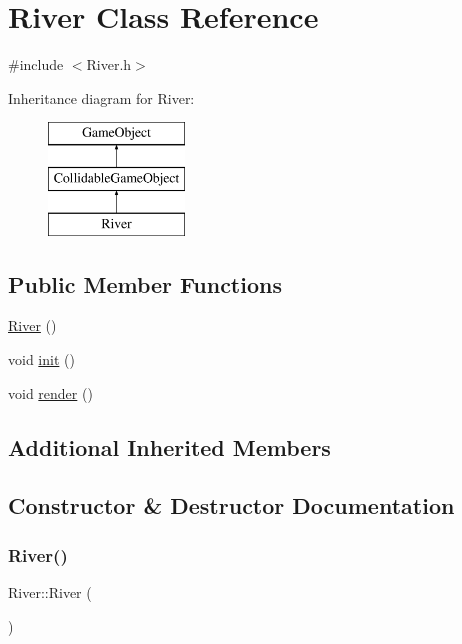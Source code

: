 \hypertarget{class_river}{}\section{River Class Reference}
\label{class_river}


{\ttfamily \#include $<$River.\+h$>$}

Inheritance diagram for River\+:\begin{figure}[H]
\begin{center}
\leavevmode
\includegraphics[height=3.000000cm]{class_river}
\end{center}
\end{figure}
\subsection*{Public Member Functions}
\begin{DoxyCompactItemize}
\item 
\hyperlink{class_river_a305d3ec8496a5373328045da3b8d8362}{River} ()
\item 
void \hyperlink{class_river_a34d39d986e411f957e77e85ba5719af4}{init} ()
\item 
void \hyperlink{class_river_abf5ba1cc4356fbf57059da23e3a1997a}{render} ()
\end{DoxyCompactItemize}
\subsection*{Additional Inherited Members}


\subsection{Constructor \& Destructor Documentation}
\mbox{\label{class_river_a305d3ec8496a5373328045da3b8d8362}} 
\subsubsection{\texorpdfstring{River()}{River()}}
{\footnotesize\ttfamily River\+::\+River (\begin{DoxyParamCaption}{ }\end{DoxyParamCaption})\hspace{0.3cm}{\ttfamily [inline]}}



